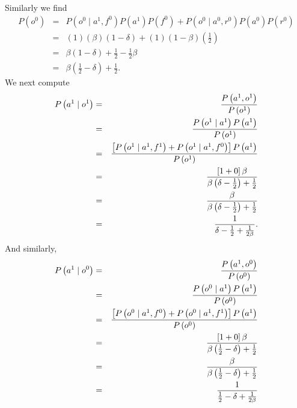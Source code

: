 \documentclass{amsart}
\theoremstyle{definition}
\theoremstyle{plain}
\numberwithin{equation}{section}
\begin{document}
Similarly we find%
\begin{eqnarray*}
P\left( o^{0}\right)  &=&P\left( o^{0}\mid a^{1},f^{0}\right) P\left(
a^{1}\right) P\left( f^{0}\right) +P\left( o^{0}\mid a^{0},r^{0}\right)
P\left( a^{0}\right) P\left( r^{0}\right)  \\
&=&\left( 1\right) \left( \beta \right) \left( 1-\delta \right) +\left(
1\right) \left( 1-\beta \right) \left( \frac{1}{2}\right)  \\
&=&\beta \left( 1-\delta \right) +\frac{1}{2}-\frac{1}{2}\beta  \\
&=&\beta \left( \frac{1}{2}-\delta \right) +\frac{1}{2}.
\end{eqnarray*}%
We next compute%
\begin{eqnarray*}
P\left( a^{1}\mid o^{1}\right)  &=&\frac{P\left( a^{1},o^{1}\right) }{%
P\left( o^{1}\right) } \\
&=&\frac{P\left( o^{1}\mid a^{1}\right) P\left( a^{1}\right) }{P\left(
o^{1}\right) } \\
&=&\frac{\left[ P\left( o^{1}\mid a^{1},f^{1}\right) +P\left( o^{1}\mid
a^{1},f^{0}\right) \right] P\left( a^{1}\right) }{P\left( o^{1}\right) } \\
&=&\frac{\left[ 1+0\right] \beta }{\beta \left( \delta -\frac{1}{2}\right) +%
\frac{1}{2}} \\
&=&\frac{\beta }{\beta \left( \delta -\frac{1}{2}\right) +\frac{1}{2}} \\
&=&\frac{1}{\delta -\frac{1}{2}+\frac{1}{2\beta }}.
\end{eqnarray*}%
And similarly,%
\begin{eqnarray*}
P\left( a^{1}\mid o^{0}\right)  &=&\frac{P\left( a^{1},o^{0}\right) }{%
P\left( o^{0}\right) } \\
&=&\frac{P\left( o^{0}\mid a^{1}\right) P\left( a^{1}\right) }{P\left(
o^{0}\right) } \\
&=&\frac{\left[ P\left( o^{0}\mid a^{1},f^{0}\right) +P\left( o^{0}\mid
a^{1},f^{1}\right) \right] P\left( a^{1}\right) }{P\left( o^{0}\right) } \\
&=&\frac{\left[ 1+0\right] \beta }{\beta \left( \frac{1}{2}-\delta \right) +%
\frac{1}{2}} \\
&=&\frac{\beta }{\beta \left( \frac{1}{2}-\delta \right) +\frac{1}{2}} \\
&=&\frac{1}{\frac{1}{2}-\delta +\frac{1}{2\beta }}
\end{eqnarray*}
\end{document}
